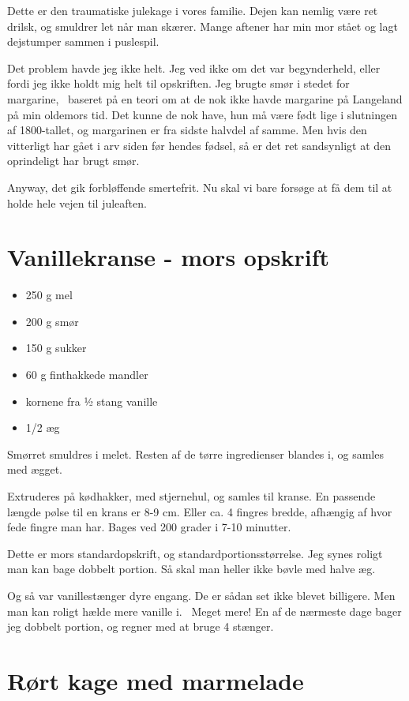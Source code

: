 \documentclass[
]{book}
\providecommand{\tightlist}{%
  \setlength{\itemsep}{0pt}\setlength{\parskip}{0pt}}
\begin{document}
Dette er den traumatiske julekage i vores familie. Dejen kan nemlig være ret drilsk, og smuldrer let når man skærer. Mange aftener har min mor stået og lagt dejstumper sammen i puslespil.

Det problem havde jeg ikke helt. Jeg ved ikke om det var begynderheld, eller fordi jeg ikke holdt mig helt til opskriften. Jeg brugte smør i stedet for margarine,~ baseret på en teori om at de nok ikke havde margarine på Langeland på min oldemors tid. Det kunne de nok have, hun må være født lige i slutningen af 1800-tallet, og margarinen er fra sidste halvdel af samme. Men hvis den vitterligt har gået i arv siden før hendes fødsel, så er det ret sandsynligt at den oprindeligt har brugt smør.

Anyway, det gik forbløffende smertefrit. Nu skal vi bare forsøge at få dem til at holde hele vejen til juleaften.

\section{Vanillekranse - mors opskrift}\label{vanillekranse---mors-opskrift}

\begin{itemize}
\tightlist
\item
  250 g mel
\item
  200 g smør
\item
  150 g sukker
\item
  60 g finthakkede mandler
\item
  kornene fra ½ stang vanille
\item
  1/2 æg
\end{itemize}

Smørret smuldres i melet. Resten af de tørre ingredienser blandes i, og samles med ægget.

Extruderes på kødhakker, med stjernehul, og samles til kranse. En passende længde pølse til en krans er 8-9 cm. Eller ca. 4 fingres bredde, afhængig af hvor fede fingre man har. Bages ved 200 grader i 7-10 minutter.

Dette er mors standardopskrift, og standardportionsstørrelse. Jeg synes roligt man kan bage dobbelt portion. Så skal man heller ikke bøvle med halve æg.

Og så var vanillestænger dyre engang. De er sådan set ikke blevet billigere. Men man kan roligt hælde mere vanille i.~ Meget mere! En af de nærmeste dage bager jeg dobbelt portion, og regner med at bruge 4 stænger.

\section{Rørt kage med marmelade}\label{ruxf8rt-kage-med-marmelade}
\end{document}
